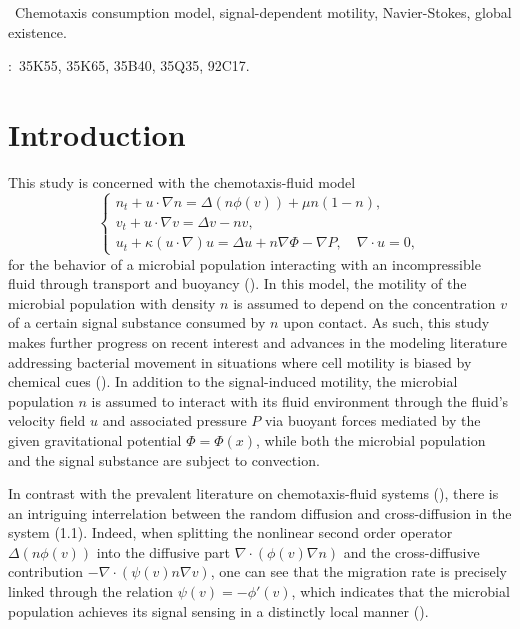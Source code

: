 \documentclass[12pt]{article}
\theoremstyle{plain}
\theoremstyle{definition}
\numberwithin{equation}{section}
\begin{document}
\vspace{0.3cm}
~Chemotaxis consumption model,  signal-dependent motility, Navier-Stokes, global existence.

:~35K55, 35K65, 35B40, 35Q35, 92C17.

\newpage
\section{Introduction}

This study is concerned with the chemotaxis-fluid model
\begin{equation}\label{1.1}
\begin{cases}
n_t+u\cdot\nabla n=\Delta (n\phi(v))+\mu n(1-n),\\
v_t+u\cdot\nabla v=\Delta v-nv,\\
u_t+ \kappa (u\cdot\nabla) u=\Delta u+n\nabla\Phi-\nabla P, \quad\nabla\cdot u=0,
\end{cases}
\end{equation}
for the  behavior of a microbial population
 interacting with an incompressible fluid through transport and buoyancy (\cite{Tuval(2005)}). In this model, the motility of the microbial population with density $n$ is assumed to depend on the concentration $v$ of a certain signal substance consumed by $n$ upon contact. As such, this study makes further progress on
recent interest and advances in the modeling literature addressing bacterial movement
in situations where cell motility is biased by chemical cues (\cite{FTLH,Liu}).
In addition to the signal-induced motility, the microbial population $n$ is assumed to interact with its fluid environment through the fluid's velocity field
$u$ and associated pressure $P$ via buoyant forces mediated by the given gravitational potential $\Phi =\Phi(x)$, while both the microbial population and the signal substance are subject to convection.

In contrast with the prevalent literature on chemotaxis-fluid systems (\cite{WinklerTAMS,WinklerCPDE,Cao}), there is an intriguing interrelation between the random diffusion and cross-diffusion in the system (1.1). Indeed, when splitting the nonlinear second order operator
 $\Delta (n\phi(v))$ into the diffusive part  $\nabla\cdot(\phi(v)\nabla n)$  and
 the cross-diffusive contribution $-\nabla\cdot(\psi(v) n\nabla v)$,
 one can see that the migration rate is precisely linked through the relation $\psi(v)=-\phi'(v)$, which indicates
 that the microbial population achieves its signal sensing in a distinctly local manner (\cite{Liu,FTLH}).
\end{document}
